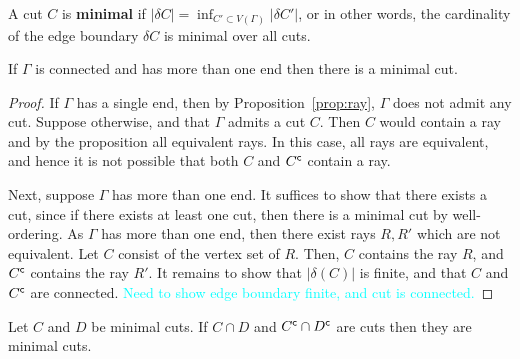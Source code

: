 \begin{definition}
    A cut \(C\) is \textbf{minimal} if 
    \(|\delta C| = \inf_{C' \subset V(\Gamma)}{|\delta C'|}\), or in other words,
    the cardinality of the edge boundary \(\delta C\) is minimal over all cuts.
\end{definition}
\begin{lemma}
     If \(\Gamma\) is connected and has more than one end then there is a minimal cut.
\end{lemma}

\begin{proof}
    If \(\Gamma\) has a single end, then by Proposition~\ref{prop:ray}, \(\Gamma\) does not admit any cut. Suppose otherwise, and that \(\Gamma\) admits a cut \(C\). Then \(C\) would contain a ray and by the proposition all equivalent rays. In this case, all rays are equivalent, and hence it is not possible that both \(C\) and \({C}^{\mathsf{c}}\) contain a ray.

    Next, suppose \(\Gamma\) has more than one end. It suffices to show that there exists a cut, since if there exists at least one cut, then there is a minimal cut by well-ordering. As \(\Gamma\) has more than one end, then there exist rays \(R, R'\) which are not equivalent. Let \(C\) consist of the vertex set of \(R\). Then, \(C\) contains the ray \(R\), and \({C}^{\mathsf{c}}\) contains the ray \(R'\). 
    It remains to show that \(|\delta(C)|\) is finite, and that \(C\) and \({C}^{\mathsf{c}}\) are connected.
    \textcolor{cyan}{Need to show edge boundary finite, and cut is connected.}
\end{proof}

\begin{lemma}
    Let \(C\) and \(D\) be minimal cuts. If \(C \cap D\) and \({C}^{\mathsf{c}} \cap {D}^{\mathsf{c}}\) are cuts then
they are minimal cuts.
\end{lemma}

